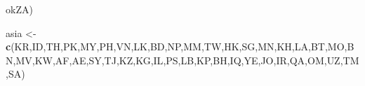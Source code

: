 \documentclass[
]{article}
\newenvironment{Shaded}{\begin{snugshade}}{\end{snugshade}}
\newcommand{\FunctionTok}[1]{\textcolor[rgb]{0.13,0.29,0.53}{\textbf{#1}}}
\newcommand{\NormalTok}[1]{#1}
\newcommand{\OtherTok}[1]{\textcolor[rgb]{0.56,0.35,0.01}{#1}}
\newcommand{\StringTok}[1]{\textcolor[rgb]{0.31,0.60,0.02}{#1}}
\begin{document}
\begin{Shaded}
\begin{Highlighting}[]
ok{\textquotesingle{}ZA\textquotesingle{}}\NormalTok{)}



\NormalTok{asia }\OtherTok{\textless{}{-}} \FunctionTok{c}\NormalTok{(}\StringTok{\textquotesingle{}KR\textquotesingle{}}\NormalTok{,}\StringTok{\textquotesingle{}ID\textquotesingle{}}\NormalTok{,}\StringTok{\textquotesingle{}TH\textquotesingle{}}\NormalTok{,}\StringTok{\textquotesingle{}PK\textquotesingle{}}\NormalTok{,}\StringTok{\textquotesingle{}MY\textquotesingle{}}\NormalTok{,}\StringTok{\textquotesingle{}PH\textquotesingle{}}\NormalTok{,}\StringTok{\textquotesingle{}VN\textquotesingle{}}\NormalTok{,}\StringTok{\textquotesingle{}LK\textquotesingle{}}\NormalTok{,}\StringTok{\textquotesingle{}BD\textquotesingle{}}\NormalTok{,}\StringTok{\textquotesingle{}NP\textquotesingle{}}\NormalTok{,}\StringTok{\textquotesingle{}MM\textquotesingle{}}\NormalTok{,}\StringTok{\textquotesingle{}TW\textquotesingle{}}\NormalTok{,}\StringTok{\textquotesingle{}HK\textquotesingle{}}\NormalTok{,}\StringTok{\textquotesingle{}SG\textquotesingle{}}\NormalTok{,}\StringTok{\textquotesingle{}MN\textquotesingle{}}\NormalTok{,}\StringTok{\textquotesingle{}KH\textquotesingle{}}\NormalTok{,}\StringTok{\textquotesingle{}LA\textquotesingle{}}\NormalTok{,}\StringTok{\textquotesingle{}BT\textquotesingle{}}\NormalTok{,}\StringTok{\textquotesingle{}MO\textquotesingle{}}\NormalTok{,}\StringTok{\textquotesingle{}BN\textquotesingle{}}\NormalTok{,}\StringTok{\textquotesingle{}MV\textquotesingle{}}\NormalTok{,}\StringTok{\textquotesingle{}KW\textquotesingle{}}\NormalTok{,}\StringTok{\textquotesingle{}AF\textquotesingle{}}\NormalTok{,}\StringTok{\textquotesingle{}AE\textquotesingle{}}\NormalTok{,}\StringTok{\textquotesingle{}SY\textquotesingle{}}\NormalTok{,}\StringTok{\textquotesingle{}TJ\textquotesingle{}}\NormalTok{,}\StringTok{\textquotesingle{}KZ\textquotesingle{}}\NormalTok{,}\StringTok{\textquotesingle{}KG\textquotesingle{}}\NormalTok{,}\StringTok{\textquotesingle{}IL\textquotesingle{}}\NormalTok{,}\StringTok{\textquotesingle{}PS\textquotesingle{}}\NormalTok{,}\StringTok{\textquotesingle{}LB\textquotesingle{}}\NormalTok{,}\StringTok{\textquotesingle{}KP\textquotesingle{}}\NormalTok{,}\StringTok{\textquotesingle{}BH\textquotesingle{}}\NormalTok{,}\StringTok{\textquotesingle{}IQ\textquotesingle{}}\NormalTok{,}\StringTok{\textquotesingle{}YE\textquotesingle{}}\NormalTok{,}\StringTok{\textquotesingle{}JO\textquotesingle{}}\NormalTok{,}\StringTok{\textquotesingle{}IR\textquotesingle{}}\NormalTok{,}\StringTok{\textquotesingle{}QA\textquotesingle{}}\NormalTok{,}\StringTok{\textquotesingle{}OM\textquotesingle{}}\NormalTok{,}\StringTok{\textquotesingle{}UZ\textquotesingle{}}\NormalTok{,}\StringTok{\textquotesingle{}TM\textquotesingle{}}\NormalTok{,}\StringTok{\textquotesingle{}SA\textquotesingle{}}\NormalTok{)}



\end{Highlighting}
\end{Shaded}
\end{document}
